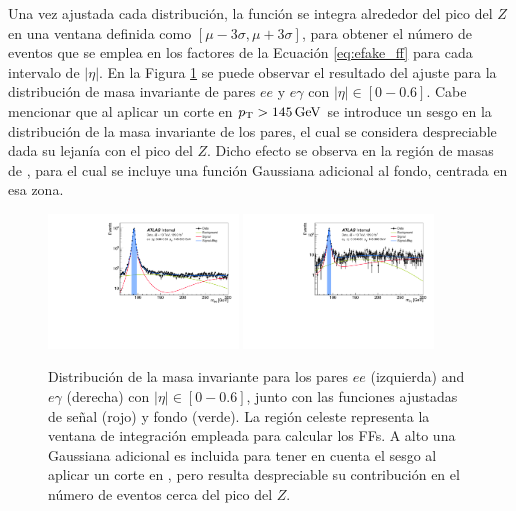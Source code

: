Una vez ajustada cada distribución, la función se integra alrededor del pico del $Z$ en una ventana definida como $[\mu - 3\sigma, \mu + 3\sigma]$, para obtener el número de eventos que se emplea en los factores de la Ecuación \ref{eq:efake_ff} para cada intervalo de $|\eta|$. En la Figura \ref{fig:efakes_fit} se puede observar el resultado del ajuste para la distribución de masa invariante de pares $ee$ y $e\gamma$ con $|\eta| \in [0-0.6]$. 
Cabe mencionar que al aplicar un corte en $p_{\text{T}}>145\,\text{GeV}$ se introduce un sesgo en la distribución de la masa invariante de los pares, el cual se considera despreciable dada su lejanía con el pico del $Z$. Dicho efecto se observa en la región de masas de , para el cual se incluye una función Gaussiana adicional al fondo, centrada en esa zona.


\begin{figure}[ht!]
  \centering
  \includegraphics[width=0.45\textwidth]{images/analysis/egFF_fit_ee_eta_0_06.pdf}
  \includegraphics[width=0.45\textwidth]{images/analysis/egFF_fit_eg_eta_0_06.pdf}
  \caption{Distribución de la masa invariante para los pares $ee$ (izquierda) and $e\gamma$ (derecha) con $|\eta| \in [0-0.6]$, junto con las funciones ajustadas de señal (rojo) y fondo (verde). La región celeste representa la ventana de integración empleada para calcular los FFs. A alto \pt una Gaussiana adicional es incluida para tener en cuenta el sesgo al aplicar un corte en \pt, pero resulta despreciable su contribución en el número de eventos cerca del pico del $Z$.}
  \label{fig:efakes_fit}
\end{figure}


